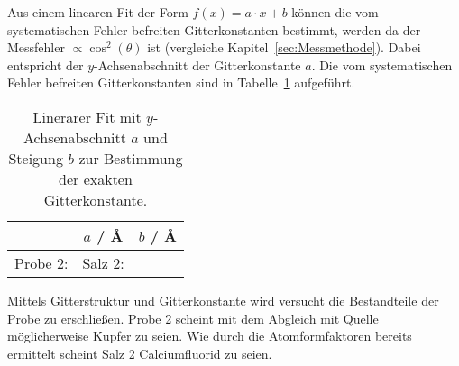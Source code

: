 Aus einem linearen Fit der Form $f(x) = a \cdot x + b$ können die vom
systematischen Fehler befreiten  
Gitterkonstanten bestimmt, werden da der Messfehler $\propto \cos^2(\theta)$ ist
(vergleiche Kapitel~\ref{sec:Messmethode}).
Dabei entspricht der $y$-Achsenabschnitt der Gitterkonstante $a$.
Die vom systematischen Fehler befreiten Gitterkonstanten sind in Tabelle~\ref{tab:gitt} aufgeführt.

\begin{table}[ht]
		\centering
		\caption{Linerarer Fit mit $y$-Achsenabschnitt $a$ und Steigung $b$ zur
				Bestimmung der exakten Gitterkonstante.}
		\label{tab:gitt}
		\begin{tabular}{l c c}
				\toprule
        & $a$ / \AA & $b$ / \AA \\
				\midrule
				Probe 2: 	& 
				Salz 2: 	& 
				\bottomrule
		\end{tabular}
\end{table}

Mittels Gitterstruktur und Gitterkonstante wird versucht die Bestandteile der
Probe zu erschließen. 
Probe 2 scheint mit dem Abgleich mit Quelle \cite{kupfer} möglicherweise Kupfer
zu seien. 
Wie durch die Atomformfaktoren bereits ermittelt scheint Salz 2 Calciumfluorid
zu seien. 
